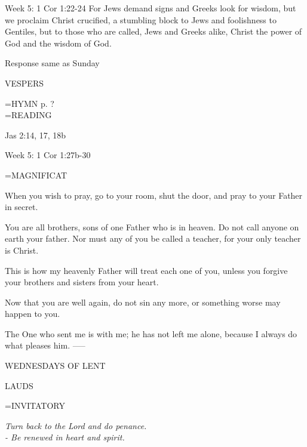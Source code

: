 Week 5:    1 Cor 1:22-24    For Jews demand signs and Greeks look for wisdom, but we proclaim Christ crucified, a stumbling block to Jews and foolishness to Gentiles, but to those who are called, Jews and Greeks alike, Christ the power of God and the wisdom of God. 

Response same as Sunday

\begin{flushleft}\normalsize VESPERS\\\end{flushleft}
\hangindent=\parindent \small{\uppercase{HYMN} p.  ?\\}
\hangindent=\parindent \small READING
\begin{description}[labelindent=\parindent, leftmargin=*]
\item [Weeks 1-4:]     Jas 2:14, 17, 18b \textbf{}
\end{description}

Week 5:    1 Cor 1:27b-30    

\hangindent=\parindent \small MAGNIFICAT
\begin{description}[labelindent=\parindent, noitemsep, leftmargin=*]
\item [Week 1:] 	When you wish to pray, go to your room, shut the door, and pray to your Father in secret.
\item [Week 2:] 	You are all brothers, sons of one Father who is in heaven. Do not call anyone on earth your father. Nor must any of you be called a teacher, for your only teacher is Christ.
\item [Week 3:] 	This is how my heavenly Father will treat each one of you, unless you forgive your brothers and sisters from your heart.
\item [Week 4:] 	Now that you are well again, do not sin any more, or something worse may happen to you.
\item [Week 5:] 	The One who sent me is with me; he has not left me alone, because I always do what pleases him.
-----
\begin{center}
\normalsize WEDNESDAYS OF LENT
\end{center}
\end{description}

\begin{flushleft}\normalsize LAUDS\\\end{flushleft}
\hangindent=\parindent \small{INVITATORY}
\begin{center}
\textit{Turn back to the Lord and do penance.\\}
\textit{- Be renewed in heart and spirit.\\}
\end{center}


